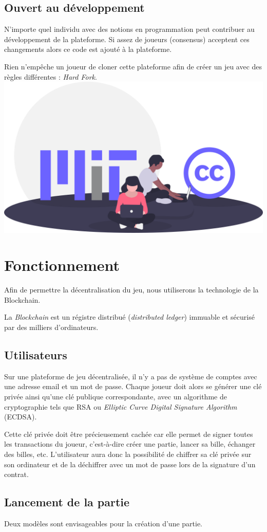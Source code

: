 \documentclass{article}
\begin{document}
\subsection{Ouvert au développement}
N'importe quel individu avec des notions en programmation peut contribuer au développement de la plateforme.
Si assez de joueurs (consensus) acceptent ces changements alors ce code est ajouté à la plateforme.

Rien n'empêche un joueur de cloner cette plateforme afin de créer un jeu avec des règles différentes : \textit{Hard Fork}.\\

\includegraphics[width=0.3\linewidth]{assets/open.png}\\

\section{Fonctionnement}
Afin de permettre la décentralisation du jeu, nous utiliserons la technologie de la Blockchain.

La \textit{Blockchain} est un régistre distribué (\textit{distributed ledger}) immuable et sécurisé par des milliers d'ordinateurs.

\subsection{Utilisateurs}
Sur une plateforme de jeu décentralisée, il n'y a pas de système de comptes avec une adresse email et un mot de passe.
Chaque joueur doit alors se générer une clé privée ainsi qu'une clé publique correspondante, avec un algorithme de cryptographie tels que RSA ou \textit{Elliptic Curve Digital Signature Algorithm} (ECDSA).

Cette clé privée doit être précieusement cachée car elle permet de signer toutes les transactions du joueur, c'est-à-dire créer une partie, lancer sa bille, échanger des billes, etc. L'utilisateur aura donc la possibilité de chiffrer sa clé privée sur son ordinateur et de la déchiffrer avec un mot de passe lors de la signature d'un contrat. 

\subsection{Lancement de la partie}
Deux modèles sont envisageables pour la création d'une partie.
\end{document}
